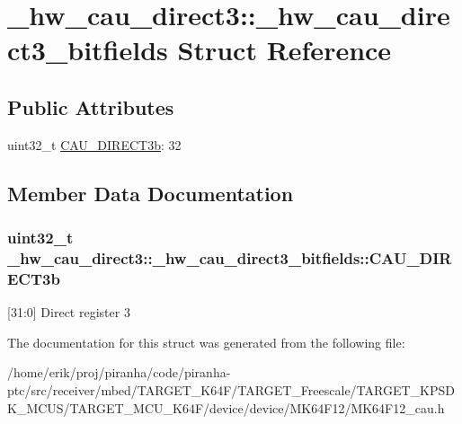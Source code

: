 \hypertarget{struct__hw__cau__direct3_1_1__hw__cau__direct3__bitfields}{}\section{\+\_\+hw\+\_\+cau\+\_\+direct3\+:\+:\+\_\+hw\+\_\+cau\+\_\+direct3\+\_\+bitfields Struct Reference}
\label{struct__hw__cau__direct3_1_1__hw__cau__direct3__bitfields}
\subsection*{Public Attributes}
\begin{DoxyCompactItemize}
\item 
uint32\+\_\+t \hyperlink{struct__hw__cau__direct3_1_1__hw__cau__direct3__bitfields_ad71514e6a498eb676d64a8e5c7724a63}{C\+A\+U\+\_\+\+D\+I\+R\+E\+C\+T3b}\+: 32
\end{DoxyCompactItemize}


\subsection{Member Data Documentation}
\subsubsection[{\texorpdfstring{C\+A\+U\+\_\+\+D\+I\+R\+E\+C\+T3b}{CAU_DIRECT3b}}]{\setlength{\rightskip}{0pt plus 5cm}uint32\+\_\+t \+\_\+hw\+\_\+cau\+\_\+direct3\+::\+\_\+hw\+\_\+cau\+\_\+direct3\+\_\+bitfields\+::\+C\+A\+U\+\_\+\+D\+I\+R\+E\+C\+T3b}\hypertarget{struct__hw__cau__direct3_1_1__hw__cau__direct3__bitfields_ad71514e6a498eb676d64a8e5c7724a63}{}\label{struct__hw__cau__direct3_1_1__hw__cau__direct3__bitfields_ad71514e6a498eb676d64a8e5c7724a63}
\mbox{[}31\+:0\mbox{]} Direct register 3 

The documentation for this struct was generated from the following file\+:\begin{DoxyCompactItemize}
\item 
/home/erik/proj/piranha/code/piranha-\/ptc/src/receiver/mbed/\+T\+A\+R\+G\+E\+T\+\_\+\+K64\+F/\+T\+A\+R\+G\+E\+T\+\_\+\+Freescale/\+T\+A\+R\+G\+E\+T\+\_\+\+K\+P\+S\+D\+K\+\_\+\+M\+C\+U\+S/\+T\+A\+R\+G\+E\+T\+\_\+\+M\+C\+U\+\_\+\+K64\+F/device/device/\+M\+K64\+F12/M\+K64\+F12\+\_\+cau.\+h\end{DoxyCompactItemize}
